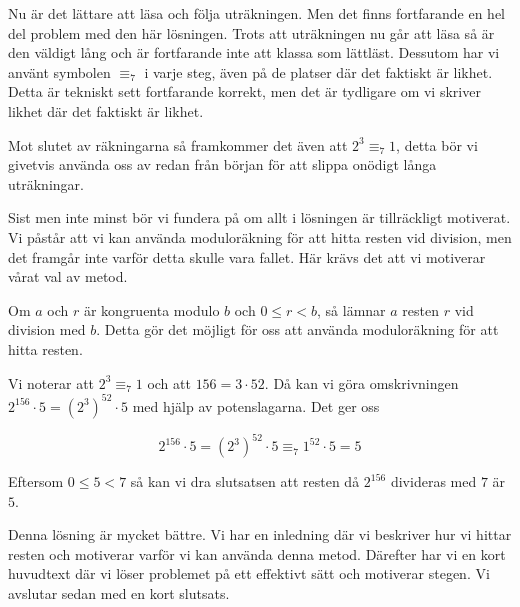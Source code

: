 \documentclass[titlepage]{article}
\begin{document}
Nu är det lättare att läsa och följa uträkningen. Men det finns fortfarande en hel del problem med den här lösningen. Trots att uträkningen nu går att läsa så är den väldigt lång och är fortfarande inte att klassa som lättläst. Dessutom har vi använt symbolen $\equiv_7$ i varje steg, även på de platser där det faktiskt är likhet. Detta är tekniskt sett fortfarande korrekt, men det är tydligare om vi skriver likhet där det faktiskt är likhet. 

Mot slutet av räkningarna så framkommer det även att $2^3 \equiv_7 1$, detta bör vi givetvis använda oss av redan från början för att slippa onödigt långa uträkningar.

Sist men inte minst bör vi fundera på om allt i lösningen är tillräckligt motiverat. Vi påstår att vi kan använda moduloräkning för att hitta resten vid division, men det framgår inte varför detta skulle vara fallet. Här krävs det att vi motiverar vårat val av metod.

\begin{center}
    \begin{tcolorbox}[width=\linewidth,colback={green!25!white},title={\textbf{Lösning 3 - Bättre}},outer arc=0mm,colupper=black]
        Om $a$ och $r$ är kongruenta modulo $b$ och $0\leq r<b$, så lämnar $a$ resten $r$ vid division med $b$. Detta gör det möjligt för oss att använda moduloräkning för att hitta resten. \vspace{2mm}

        Vi noterar att $2^3 \equiv_7 1$ och att $156 = 3\cdot 52$. Då kan vi göra omskrivningen $2^{156}\cdot 5 = (2^3)^{52} \cdot 5$ med hjälp av potenslagarna. Det ger oss

        $$2^{156}\cdot 5 = (2^3)^{52} \cdot 5 \equiv_7 1^{52} \cdot 5 = 5$$

        Eftersom $0\leq 5<7$ så kan vi dra slutsatsen att resten då $2^{156}$ divideras med $7$ är $5$.
    \end{tcolorbox} 
    \end{center}

Denna lösning är mycket bättre. Vi har en inledning där vi beskriver hur vi hittar resten och motiverar varför vi kan använda denna metod. Därefter har vi en kort huvudtext där vi löser problemet på ett effektivt sätt och motiverar stegen. Vi avslutar sedan med en kort slutsats.



\end{document}
